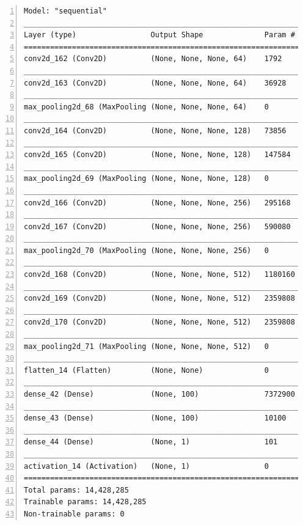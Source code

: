 \documentclass[ 12pt ]{article}
\begin{document}
\begin{lstlisting}[basicstyle=\ttfamily\footnotesize, numbers=left, tabsize=4, frame=single, breaklines=true, postbreak=\mbox{\textcolor{red}{$\hookrightarrow$}\space}]
Model: "sequential"
_________________________________________________________________
Layer (type)                 Output Shape              Param #   
=================================================================
conv2d_162 (Conv2D)          (None, None, None, 64)    1792      
_________________________________________________________________
conv2d_163 (Conv2D)          (None, None, None, 64)    36928     
_________________________________________________________________
max_pooling2d_68 (MaxPooling (None, None, None, 64)    0         
_________________________________________________________________
conv2d_164 (Conv2D)          (None, None, None, 128)   73856     
_________________________________________________________________
conv2d_165 (Conv2D)          (None, None, None, 128)   147584    
_________________________________________________________________
max_pooling2d_69 (MaxPooling (None, None, None, 128)   0         
_________________________________________________________________
conv2d_166 (Conv2D)          (None, None, None, 256)   295168    
_________________________________________________________________
conv2d_167 (Conv2D)          (None, None, None, 256)   590080    
_________________________________________________________________
max_pooling2d_70 (MaxPooling (None, None, None, 256)   0         
_________________________________________________________________
conv2d_168 (Conv2D)          (None, None, None, 512)   1180160   
_________________________________________________________________
conv2d_169 (Conv2D)          (None, None, None, 512)   2359808   
_________________________________________________________________
conv2d_170 (Conv2D)          (None, None, None, 512)   2359808   
_________________________________________________________________
max_pooling2d_71 (MaxPooling (None, None, None, 512)   0         
_________________________________________________________________
flatten_14 (Flatten)         (None, None)              0         
_________________________________________________________________
dense_42 (Dense)             (None, 100)               7372900   
_________________________________________________________________
dense_43 (Dense)             (None, 100)               10100     
_________________________________________________________________
dense_44 (Dense)             (None, 1)                 101       
_________________________________________________________________
activation_14 (Activation)   (None, 1)                 0         
=================================================================
Total params: 14,428,285
Trainable params: 14,428,285
Non-trainable params: 0
\end{lstlisting}
\end{document}
